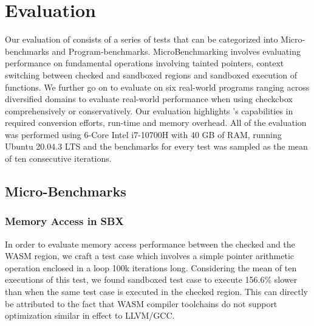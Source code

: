 \section{Evaluation}\label{sec:evaluation}

Our evaluation of \systemname consists of a series of tests that can be categorized into Micro-benchmarks and Program-benchmarks.
MicroBenchmarking involves evaluating performance on fundamental operations involving tainted pointers, context switching between checked and sandboxed regions and sandboxed execution of functions. We further go on to evaluate \systemname on six real-world programs ranging across diversified domains to evaluate real-world performance when using checkcbox comprehensively or conservatively. Our evaluation highlights \systemname's capabilities in required conversion efforts, run-time and memory overhead.
All of the evaluation was performed using 6-Core Intel i7-10700H with 40 GB of RAM, running Ubuntu 20.04.3 LTS and the benchmarks for every test was sampled as the mean of ten consecutive iterations.

\subsection{Micro-Benchmarks}
\subsubsection{Memory Access in SBX}
In order to evaluate memory access performance between the checked and the WASM region, we craft a test case which involves a simple pointer arithmetic operation enclosed in a loop 100k iterations long. Considering the mean of ten executions of this test, we found sandboxed test case to execute 156.6\% slower than when the same test case is executed in the checked region. This can directly be attributed to the fact that WASM compiler toolchains do not support optimization similar in effect to LLVM/GCC. 

